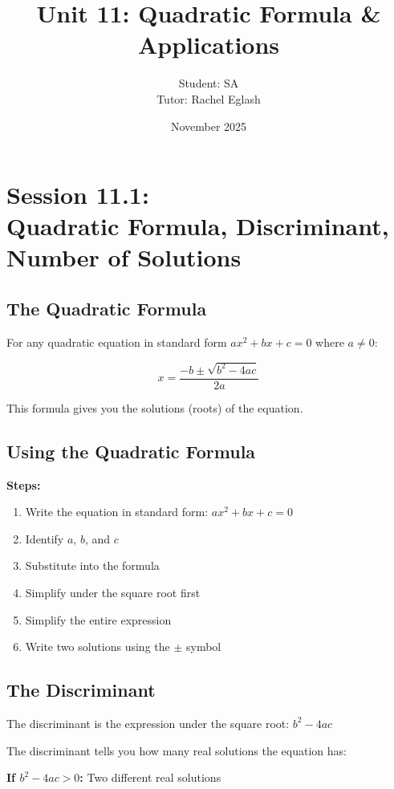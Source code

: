 \documentclass[12pt]{article}
\title{Unit 11: Quadratic Formula \& Applications}
\author{
	Student: SA\\
	Tutor: Rachel Eglash}
\date{November 2025}
\begin{document}
	
	\maketitle
    
    \newpage

	\section*{Session 11.1: \\ Quadratic Formula, Discriminant, Number of Solutions}

		\subsection*{The Quadratic Formula}

			For any quadratic equation in standard form $ax^2 + bx + c = 0$ where $a \neq 0$:

			$$x = \frac{-b \pm \sqrt{b^2 - 4ac}}{2a}$$

			This formula gives you the solutions (roots) of the equation.

		\subsection*{Using the Quadratic Formula}

			\textbf{Steps:}
			\begin{enumerate}
				\item Write the equation in standard form: $ax^2 + bx + c = 0$
				\item Identify $a$, $b$, and $c$
				\item Substitute into the formula
				\item Simplify under the square root first
				\item Simplify the entire expression
				\item Write two solutions using the $\pm$ symbol
			\end{enumerate}

		\subsection*{The Discriminant}

			The discriminant is the expression under the square root: $b^2 - 4ac$

			The discriminant tells you how many real solutions the equation has:

			\textbf{If $b^2 - 4ac > 0$:} Two different real solutions
\end{document}
